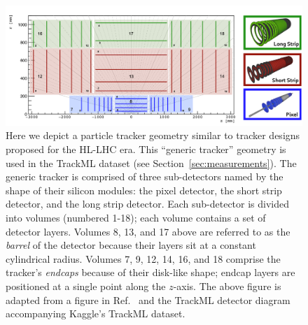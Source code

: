\documentclass[twocolumn]{svjour3}
\begin{document}
\begin{figure}[!htbp]
\centering
\includegraphics[width=0.99\columnwidth,clip]{pixel_detector.pdf}
\caption{Here we depict a particle tracker geometry similar to tracker designs proposed for the HL-LHC era. 
This ``generic tracker'' geometry is used in the TrackML dataset (see Section~\ref{sec:measurements}). 
The generic tracker is comprised of three sub-detectors named by the shape of their silicon modules: the pixel detector, the short strip detector, and the long strip detector. 
Each sub-detector is divided into volumes (numbered 1-18); each volume contains a set of detector layers. 
Volumes 8, 13, and 17 above are referred to as the \textit{barrel} of the detector because their layers sit at a constant cylindrical radius. 
Volumes 7, 9, 12, 14, 16, and 18 comprise the tracker's \textit{endcaps} because of their disk-like shape; endcap layers are positioned at a single point along the $z$-axis. 
The above figure is adapted from a figure in Ref.~\cite{TrackML} and the TrackML detector diagram accompanying Kaggle's TrackML dataset.}
\label{fig:pixel} 
\end{figure}
\end{document}
